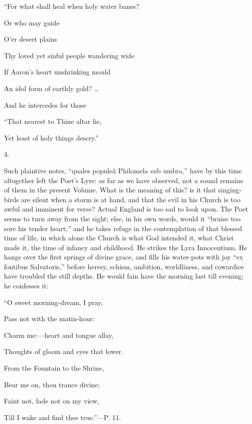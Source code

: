 ``For
what shall heal when holy water banes?

Or
who may guide

O'er
desert plains

Thy loved yet sinful people wandering wide

If Aaron's heart unshrinking mould

An idol form of earthly gold? …

And he intercedes for those

``That
nearest to Thine altar lie,

Yet least of holy things descry.''

4.

Such plaintive notes, ``quales populeâ Philomela
sub umbra,'' have by this time altogether left the Poet's Lyre: as far
as we have observed, not a sound remains of them in the present
Volume. What is the meaning of this? is it that singing-birds are
silent when a storm is at hand, and that the evil in his Church is too
awful and imminent for verse? Actual England is too sad to look upon.
The Poet seems to turn away from the sight; else, in his own words,
would it ``bruise too sore his tender heart;'' and he takes refuge in
the contemplation of that blessed time of life, in which alone the
Church is what God intended it, what Christ made it, the time of
infancy and childhood. He strikes the Lyra Innocentium. He hangs over
the first springs of divine grace, and fills his water-pots with joy ``ex
fontibus Salvatoris,'' before heresy, schism, ambition, worldliness,
and cowardice have troubled the still depths. He would fain have the
morning last till evening; he confesses it:

``O sweet
morning-dream, I pray,

Pass not with the matin-hour:

Charm me:—heart and tongue allay,

Thoughts of gloom and eyes that lower. 

From the Fountain to the Shrine,

Bear me on, thou trance divine;

Faint not, fade not on my view,

Till I wake and find thee true.''—P. 11.

